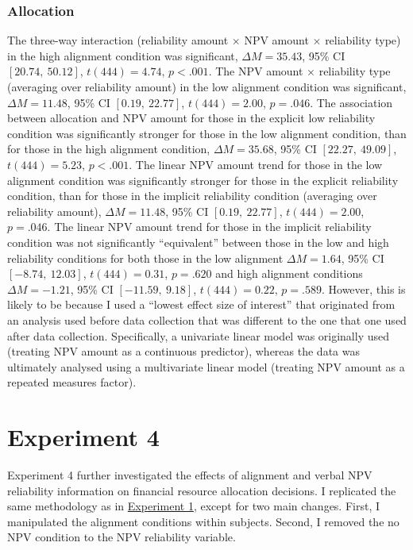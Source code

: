 \documentclass[a4paper, nobind, dvipsnames]{templates/ociamthesis}
\theoremstyle{definition}
\theoremstyle{definition}
\theoremstyle{definition}
\theoremstyle{definition}
\theoremstyle{remark}
\begin{document}
\hypertarget{results-alignment-8-allocation}{%
\subsubsection{Allocation}\label{results-alignment-8-allocation}}

The three-way interaction
(reliability amount \(\times\) NPV amount \(\times\) reliability type) in the high
alignment condition was significant,
\(\Delta M = 35.43\), 95\% CI \([20.74,~50.12]\), \(t(444) = 4.74\), \(p < .001\). The NPV amount
\(\times\) reliability type (averaging over reliability amount) in the low
alignment condition was significant,
\(\Delta M = 11.48\), 95\% CI \([0.19,~22.77]\), \(t(444) = 2.00\), \(p = .046\). The association
between allocation and NPV amount for those in the explicit low reliability
condition was significantly stronger for those in the low alignment condition,
than for those in the high alignment condition,
\(\Delta M = 35.68\), 95\% CI \([22.27,~49.09]\), \(t(444) = 5.23\), \(p < .001\).
The linear NPV amount trend for those in the low alignment condition was
significantly stronger for those in the explicit reliability condition, than for
those in the implicit reliability condition (averaging over reliability amount),
\(\Delta M = 11.48\), 95\% CI \([0.19,~22.77]\), \(t(444) = 2.00\), \(p = .046\). The linear
NPV amount trend for those in the implicit reliability condition was not
significantly ``equivalent'' between those in the low and high reliability
conditions for both those in the low alignment
\(\Delta M = 1.64\), 95\% CI \([-8.74,~12.03]\), \(t(444) = 0.31\), \(p = .620\)
and high alignment conditions
\(\Delta M = -1.21\), 95\% CI \([-11.59,~9.18]\), \(t(444) = 0.22\), \(p = .589\).
However, this is likely to be because I used a ``lowest effect size of interest''
that originated from an analysis used before data collection that was different
to the one that one used after data collection. Specifically, a univariate
linear model was originally used (treating NPV amount as a continuous
predictor), whereas the data was ultimately analysed using a multivariate linear
model (treating NPV amount as a repeated measures factor).

\hypertarget{alignment-1}{%
\section{Experiment 4}\label{alignment-1}}

Experiment 4 further investigated the effects of alignment and verbal NPV
reliability information on financial resource allocation decisions. I replicated
the same methodology as in \protect\hyperlink{method-alignment-2}{Experiment 1}, except for two
main changes. First, I manipulated the alignment conditions within subjects.
Second, I removed the no NPV condition to the NPV reliability variable.
\end{document}
